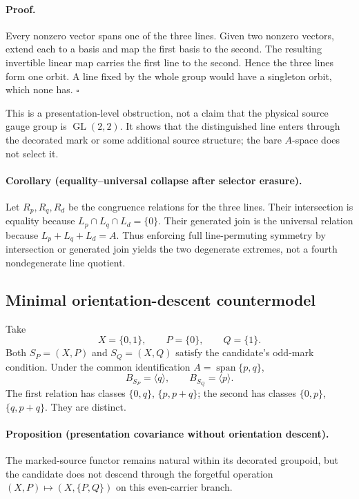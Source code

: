 \paragraph{Proof.}
Every nonzero vector spans one of the three lines.  Given two nonzero
vectors, extend each to a basis and map the first basis to the second.  The
resulting invertible linear map carries the first line to the second.  Hence
the three lines form one orbit.  A line fixed by the whole group would have a
singleton orbit, which none has. \(\square\)

This is a presentation-level obstruction, not a claim that the physical
source gauge group is \(\operatorname{GL}(2,2)\).  It shows that the
distinguished line enters through the decorated mark or some additional
source structure; the bare \(A\)-space does not select it.

\paragraph{Corollary (equality--universal collapse after selector erasure).}
Let \(R_p,R_q,R_d\) be the congruence relations for the three lines.  Their
intersection is equality because
\(L_p\cap L_q\cap L_d=\{0\}\).  Their generated join is the universal
relation because \(L_p+L_q+L_d=A\).  Thus enforcing full line-permuting
symmetry by intersection or generated join yields the two degenerate
extremes, not a fourth nondegenerate line quotient.

\subsection{Minimal orientation-descent countermodel}

Take
\[
 X=\{0,1\},\qquad P=\{0\},\qquad Q=\{1\}.
\]
Both \(S_P=(X,P)\) and \(S_Q=(X,Q)\) satisfy the candidate's odd-mark
condition.  Under the common identification
\(A=\operatorname{span}\{p,q\}\),
\[
 B_{S_P}=\langle q\rangle,\qquad B_{S_Q}=\langle p\rangle.
\]
The first relation has classes
\(\{0,q\}\), \(\{p,p+q\}\); the second has classes
\(\{0,p\}\), \(\{q,p+q\}\).  They are distinct.

\paragraph{Proposition (presentation covariance without orientation
descent).}
The marked-source functor remains natural within its decorated groupoid, but
the candidate does not descend through the forgetful operation
\((X,P)\mapsto(X,\{P,Q\})\) on this even-carrier branch.

